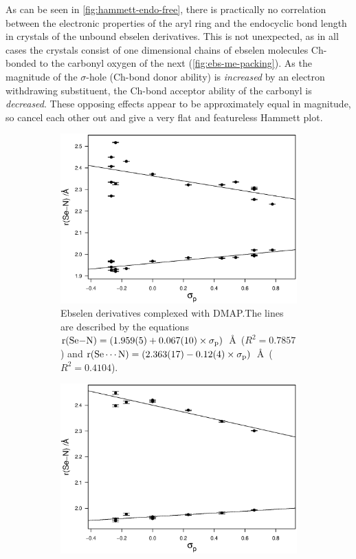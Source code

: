 \begin{refsection}
As can be seen in \cref{fig:hammett-endo-free}, there is practically no correlation between the electronic properties of the aryl ring and the endocyclic  bond length in crystals of the unbound ebselen derivatives.
This is not unexpected, as in all cases the crystals consist of one dimensional chains of ebselen molecules Ch-bonded to the carbonyl oxygen of the next (\cref{fig:ebs-me-packing}).
As the magnitude of the $ \sigma $-hole (Ch-bond donor ability) is \emph{increased} by an electron withdrawing substituent, the Ch-bond acceptor ability of the carbonyl is \emph{decreased}.
These opposing effects appear to be approximately equal in magnitude, so cancel each other out and give a very flat and featureless Hammett plot.

\begin{figure}
\centering
\begin{subfigure}[t]{0.45\linewidth}
  \centering
  \includegraphics[width=\linewidth]{Figures/hammett-dmap-p.eps}
  \caption{Ebselen derivatives complexed with DMAP.\@ The lines are described by the equations $\mathrm{r}(\ce{Se-N}) = (1.959(5) + 0.067(10) \times \sigma_\text{p})$~\AA~($R^2=0.7857$) and $\mathrm{r}(\ce{Se\cdots N}) = (2.363(17) - 0.12(4) \times \sigma_\text{p})$~\AA~($R^2=0.4104$).}\label{fig:hammett-dmap-para}
\end{subfigure}
\hfill
\begin{subfigure}[t]{0.45\linewidth}
\centering
\includegraphics[width=\linewidth]{Figures/hammett-morph-p.eps}

\end{subfigure}
\end{figure}
\end{refsection}
